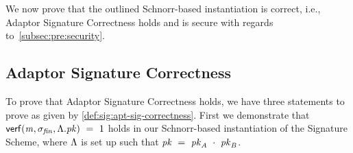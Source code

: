 We now prove that the outlined Schnorr-based instantiation is correct, i.e., Adaptor Signature Correctness holds and is secure with regards to~\cref{subsec:pre:security}.

\subsection{Adaptor Signature Correctness}\label{subsec:sig:aptsig-correctness}

To prove that Adaptor Signature Correctness holds, we have three statements to prove as given by \cref{def:sig:apt-sig-correctness}.
First we demonstrate that $\mathsf{verf}(\mathit{m}, \sigma_{\mathit{fin}}, \Lambda.\mathit{pk}) ~=~ 1$ holds in our Schnorr-based instantiation of the Signature Scheme, where $\Lambda$ is set up such that $\mathit{pk} ~=~ \mathit{pk}_{\mathit{A}} ~\cdot~ \mathit{pk}_{\mathit{B}}$.

